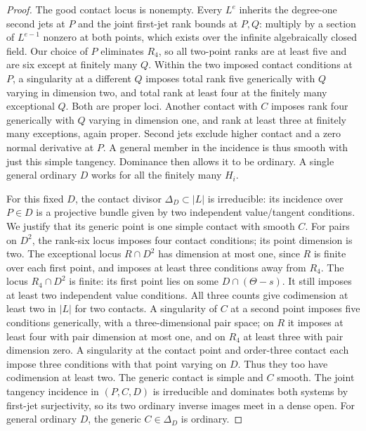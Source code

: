 \begin{proof}
The good contact locus is nonempty. Every $L^e$ inherits the degree-one
second jets at $P$ and the joint first-jet rank bounds at $P,Q$: multiply
by a section of $L^{e-1}$ nonzero at both points, which exists over the
infinite algebraically closed field. Our choice of $P$ eliminates $R_4$,
so all two-point ranks are at least five and are six except at finitely
many $Q$. Within the two imposed contact conditions at $P$, a singularity
at a different $Q$ imposes total rank five generically with $Q$ varying
in dimension two, and total rank at least four at the finitely many
exceptional $Q$. Both are proper loci. Another contact with $C$ imposes
rank four generically with $Q$ varying in dimension one, and rank at least
three at finitely many exceptions, again proper. Second jets exclude
higher contact and a zero normal derivative at $P$. A general member in
the incidence is thus smooth with just this simple tangency. Dominance
then allows it to be ordinary. A single general ordinary $D$ works for
all the finitely many $H_i$.

For this fixed $D$, the contact divisor $\Delta_D\subset|L|$ is
irreducible: its incidence over $P\in D$ is a projective bundle given by
two independent value/tangent conditions. We justify that its generic
point is one simple contact with smooth $C$. For pairs on $D^2$, the
rank-six locus imposes four contact conditions; its point dimension is
two. The exceptional locus $R\cap D^2$ has dimension at most one, since
$R$ is finite over each first point, and imposes at least three conditions
away from $R_4$. The locus $R_4\cap D^2$ is finite: its first point lies
on some $D\cap(\Theta-s)$. It still imposes at least two independent
value conditions. All three counts give codimension at least two in
$|L|$ for two contacts. A singularity of $C$ at a second point imposes
five conditions generically, with a three-dimensional pair space; on
$R$ it imposes at least four with pair dimension at most one, and on
$R_4$ at least three with pair dimension zero. A singularity at the
contact point and order-three contact each impose three conditions with
that point varying on $D$. Thus they too have codimension at least two.
The generic contact is simple and $C$ smooth. The joint tangency incidence
in $(P,C,D)$ is irreducible and dominates both systems by first-jet
surjectivity, so its two ordinary inverse images meet in a dense open.
For general ordinary $D$, the generic $C\in\Delta_D$ is ordinary.


\end{proof}
